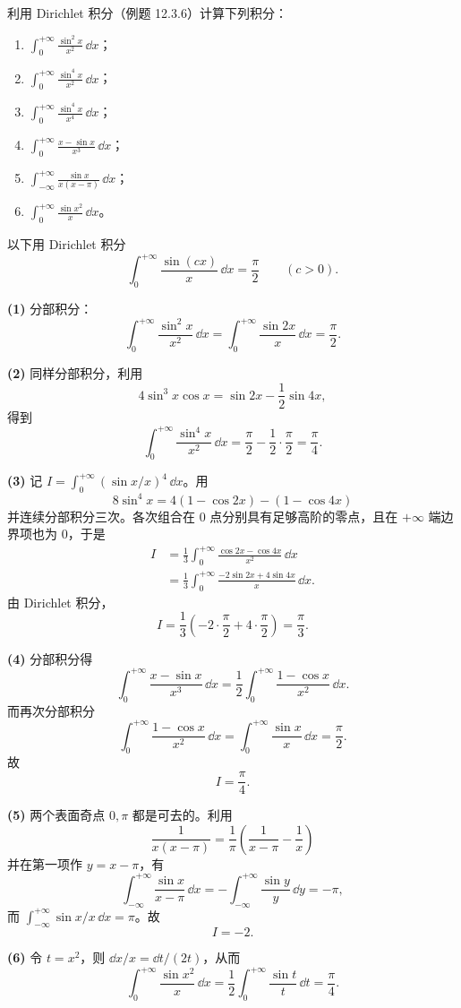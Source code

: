 \begin{xexercise}[5]
利用 Dirichlet 积分（例题 12.3.6）计算下列积分：
  \begin{enumerate}[label=(\arabic*)]
    \item $\displaystyle\int_0^{+\infty}\frac{\sin^2x}{x^2}\,\dd x$；
    \item $\displaystyle\int_0^{+\infty}\frac{\sin^4x}{x^2}\,\dd x$；
    \item $\displaystyle\int_0^{+\infty}\frac{\sin^4x}{x^4}\,\dd x$；
    \item $\displaystyle\int_0^{+\infty}\frac{x-\sin x}{x^3}\,\dd x$；
    \item $\displaystyle\int_{-\infty}^{+\infty}\frac{\sin x}{x(x-\pi)}\,\dd x$；
    \item $\displaystyle\int_0^{+\infty}\frac{\sin x^2}{x}\,\dd x$。
  \end{enumerate}
\end{xexercise}
\begin{xsolution}
以下用 Dirichlet 积分
\[
  \int_0^{+\infty}\frac{\sin(cx)}x\,\dd x=\frac\pi2\qquad(c>0).
\]

\textbf{(1)} 分部积分：
\[
  \int_0^{+\infty}\frac{\sin^2x}{x^2}\,\dd x
  =\int_0^{+\infty}\frac{\sin2x}{x}\,\dd x
  =\boxed{\frac\pi2}.
\]

\textbf{(2)} 同样分部积分，利用
\[
  4\sin^3x\cos x=\sin2x-\frac12\sin4x,
\]
得到
\[
  \boxed{\int_0^{+\infty}\frac{\sin^4x}{x^2}\,\dd x
  =\frac\pi2-\frac12\cdot\frac\pi2=\frac\pi4}.
\]

\textbf{(3)} 记 $I=\int_0^{+\infty}(\sin x/x)^4\,\dd x$。用
\[
  8\sin^4x=4(1-\cos2x)-(1-\cos4x)
\]
并连续分部积分三次。各次组合在 $0$ 点分别具有足够高阶的零点，且在 $+\infty$ 端边界项也为 $0$，于是
\begin{align*}
  I
  &=\frac13\int_0^{+\infty}\frac{\cos2x-\cos4x}{x^2}\,\dd x\\
  &=\frac13\int_0^{+\infty}\frac{-2\sin2x+4\sin4x}{x}\,\dd x.
\end{align*}
由 Dirichlet 积分，
\[
  I=\frac13\left(-2\cdot\frac\pi2+4\cdot\frac\pi2\right)
  =\boxed{\frac\pi3}.
\]

\textbf{(4)} 分部积分得
\[
  \int_0^{+\infty}\frac{x-\sin x}{x^3}\,\dd x
  =\frac12\int_0^{+\infty}\frac{1-\cos x}{x^2}\,\dd x.
\]
而再次分部积分
\[
  \int_0^{+\infty}\frac{1-\cos x}{x^2}\,\dd x
  =\int_0^{+\infty}\frac{\sin x}{x}\,\dd x=\frac\pi2.
\]
故
\[
  \boxed{I=\frac\pi4}.
\]

\textbf{(5)} 两个表面奇点 $0,\pi$ 都是可去的。利用
\[
  \frac1{x(x-\pi)}=\frac1\pi\left(\frac1{x-\pi}-\frac1x\right)
\]
并在第一项作 $y=x-\pi$，有
\[
  \int_{-\infty}^{+\infty}\frac{\sin x}{x-\pi}\,\dd x
  =-\int_{-\infty}^{+\infty}\frac{\sin y}{y}\,\dd y=-\pi,
\]
而 $\int_{-\infty}^{+\infty}\sin x/x\,\dd x=\pi$。故
\[
  \boxed{I=-2}.
\]

\textbf{(6)} 令 $t=x^2$，则 $\dd x/x=\dd t/(2t)$，从而
\[
  \boxed{\int_0^{+\infty}\frac{\sin x^2}{x}\,\dd x
  =\frac12\int_0^{+\infty}\frac{\sin t}{t}\,\dd t=\frac\pi4}.
\]
\end{xsolution}


